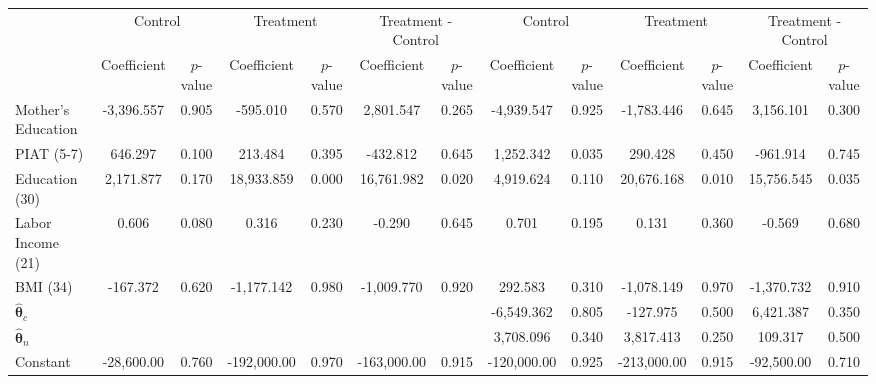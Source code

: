 \begin{tabular}{lcccccccccccc} \toprule
&\multicolumn{2}{c}{Control} & \multicolumn{2}{c}{Treatment} & \multicolumn{2}{c}{Treatment - Control} & \multicolumn{2}{c}{Control} & \multicolumn{2}{c}{Treatment} & \multicolumn{2}{c}{Treatment - Control} \\
 & Coefficient  & $p$-value  & Coefficient  & $p$-value & Coefficient  & $p$-value  & Coefficient  & $p$-value  & Coefficient  & $p$-value  & Coefficient  & $p$-value \\ \midrule
Mother's Education & -3,396.557 &     0.905 &  -595.010 &     0.570 &  2,801.547 &     0.265 & -4,939.547 &     0.925 & -1,783.446 &     0.645 &  3,156.101 &     0.300 \\  
PIAT (5-7)&   646.297 &     0.100 &   213.484 &     0.395 &  -432.812 &     0.645 &  1,252.342 &     0.035 &   290.428 &     0.450 &  -961.914 &     0.745 \\  
Education (30) &  2,171.877 &     0.170 & 18,933.859 &     0.000 & 16,761.982 &     0.020 &  4,919.624 &     0.110 & 20,676.168 &     0.010 & 15,756.545 &     0.035 \\  
Labor Income (21) &     0.606 &     0.080 &     0.316 &     0.230 &    -0.290 &     0.645 &     0.701 &     0.195 &     0.131 &     0.360 &    -0.569 &     0.680 \\  
BMI (34)  &  -167.372 &     0.620 & -1,177.142 &     0.980 & -1,009.770 &     0.920 &   292.583 &     0.310 & -1,078.149 &     0.970 & -1,370.732 &     0.910 \\  
$\hat{\bm{\theta}}_{c}$ &         &        &        &        &        &        &-6,549.362 &     0.805 &  -127.975 &     0.500 &  6,421.387 &     0.350 \\  
$\hat{\bm{\theta}}_{n}$ &         &        &        &        &        &        & 3,708.096 &     0.340 &  3,817.413 &     0.250 &   109.317 &     0.500 \\  
Constant & -28,600.00 &     0.760 & -192,000.00 &     0.970 & -163,000.00 &     0.915 & -120,000.00 &     0.925 & -213,000.00 &     0.915 & -92,500.00 &     0.710 \\  
\bottomrule \end{tabular}
